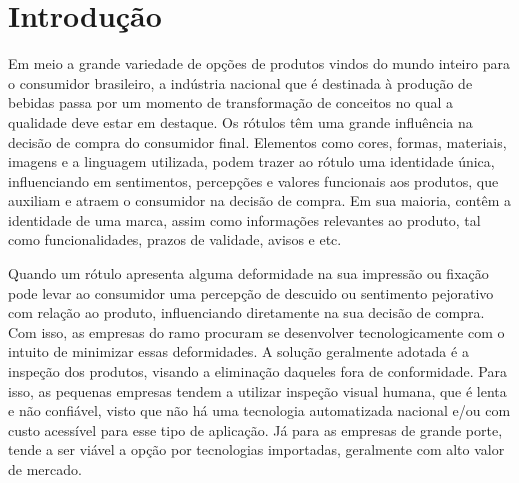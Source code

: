 \chapter{Introdução}


	Em meio a grande variedade de opções de produtos vindos do mundo inteiro para o consumidor brasileiro, a indústria nacional que é destinada à produção de bebidas passa por um momento de transformação de conceitos no qual a qualidade deve estar em destaque. Os rótulos têm uma grande influência na decisão de compra do consumidor final. Elementos como cores, formas, materiais, imagens  e a linguagem utilizada, podem trazer ao rótulo uma identidade única, influenciando em sentimentos, percepções e valores funcionais aos produtos, que auxiliam e atraem o consumidor na decisão de compra. Em sua maioria, contêm a identidade de uma marca, assim como informações relevantes ao produto, tal como funcionalidades, prazos de validade, avisos e etc. 
	 
	Quando um rótulo apresenta alguma deformidade na sua impressão ou fixação pode levar ao consumidor uma percepção de descuido ou sentimento pejorativo com relação ao produto, influenciando diretamente na sua decisão de compra. Com isso, as empresas do ramo procuram se desenvolver tecnologicamente com o intuito de minimizar essas deformidades. A solução geralmente adotada é a inspeção dos produtos, visando a eliminação daqueles fora de conformidade. Para isso, as pequenas empresas tendem a utilizar inspeção visual humana, que é lenta e não confiável, visto que não há uma tecnologia automatizada nacional e/ou com custo acessível para esse tipo de aplicação. Já para as empresas de grande porte, tende a ser viável a opção por tecnologias importadas, geralmente com alto valor de mercado. 
	 
